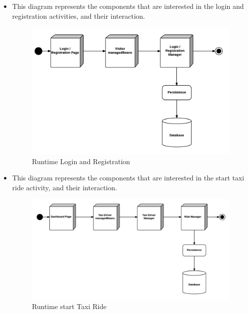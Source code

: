 \begin{itemize}
	\item This diagram represents the components that are interested in the login and registration activities, and their interaction.
	\begin{figure}[htbp]
	\centering
	\includegraphics[width=\textwidth]{cpt/img/RuntimeLoginRegisterView}
	\caption{Runtime Login and Registration}
	\end{figure}
	\clearpage
	
	\item This diagram represents the components that are interested in the start taxi ride activity, and their interaction.
	\begin{figure}[htbp]
	\centering
	\includegraphics[width=\textwidth]{cpt/img/RuntimeStartTaxiRideView}
	\caption{Runtime start Taxi Ride}
	\end{figure}
	\clearpage
	

\end{itemize}
